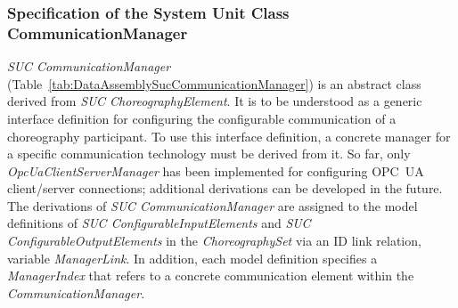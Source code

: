 \subsubsection{Specification of the System Unit Class CommunicationManager}

\emph{SUC CommunicationManager} (Table~\ref{tab:DataAssemblySucCommunicationManager}) is an abstract class derived from \emph{SUC ChoreographyElement}. It is to be understood as a generic interface definition for configuring the configurable communication of a choreography participant. To use this interface definition, a concrete manager for a specific communication technology must be derived from it. So far, only \emph{OpcUaClientServerManager} has been implemented for configuring OPC~UA client/server connections; additional derivations can be developed in the future. The derivations of \emph{SUC CommunicationManager} are assigned to the model definitions of \emph{SUC ConfigurableInputElements} and \emph{SUC ConfigurableOutputElements} in the \emph{ChoreographySet} via an ID link relation, variable \emph{ManagerLink}. In addition, each model definition specifies a \emph{ManagerIndex} that refers to a concrete communication element within the \emph{CommunicationManager}.

